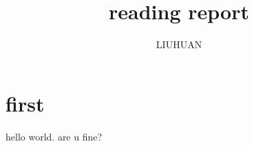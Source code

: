 \documentclass[a4paper,40pt]{article}
\begin{document}
        \title{\textit{ } \\ reading report }
        \author{LIUHUAN}
\maketitle
        
\section{first}
	hello world.
	are u fine?
     

        
\end{document}
